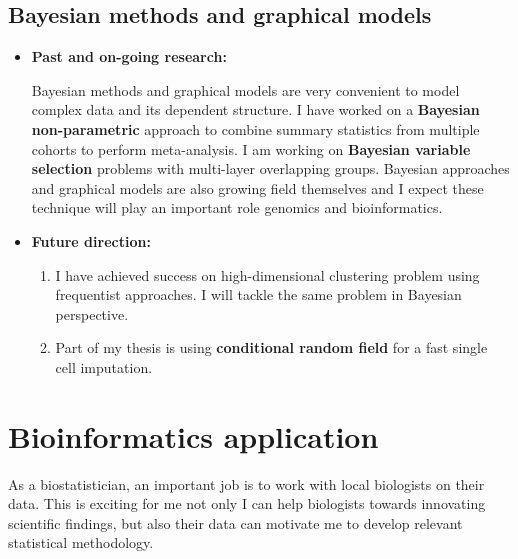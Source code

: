 \documentclass[a4paper, 10pt]{article}
\begin{document}
\subsection{Bayesian methods and graphical models}
\begin{itemize}
\item \textbf{Past and on-going research:}

Bayesian methods and graphical models are very convenient to model complex data and its dependent structure.
I have worked on a \textbf{Bayesian non-parametric} approach to combine summary statistics from multiple cohorts to perform meta-analysis\cite{ref:BayesMP}.
I am working on \textbf{Bayesian variable selection} problems\cite{ref:MOG} with multi-layer overlapping groups.
Bayesian approaches and graphical models are also growing field themselves and I expect these technique will play an important role genomics and bioinformatics.

\item \textbf{Future direction:}
\begin{enumerate}
\item I have achieved success on high-dimensional clustering problem using frequentist approaches.
I will tackle the same problem in Bayesian perspective.
\item Part of my thesis is using \textbf{conditional random field} for a fast single cell imputation.

\end{enumerate}

\end{itemize}


\section{Bioinformatics application}
As a biostatistician,
an important job is to work with local biologists on their data.
This is exciting for me not only I can help biologists towards innovating scientific findings,
but also their data can motivate me to develop relevant statistical methodology.
\end{document}
